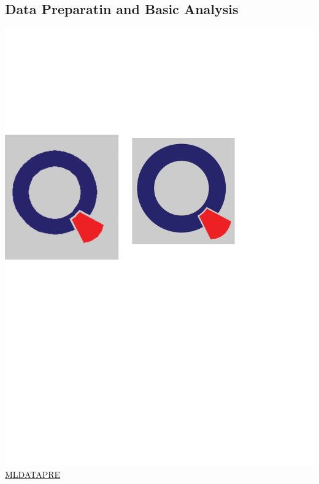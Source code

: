 \documentclass[12pt, a4paper, bibliography=totoc, english]{scrartcl}
\begin{document}
\subsection{Data Preparatin and Basic Analysis}
\includegraphics[scale=0.08]{qletlogo}
\textcolor{blue}{\href{https://github.com/JingyiLiu3136/MLFBM/blob/master/MLDATAPRE/SPL_MLDATAPRE.R}{MLDATAPRE}}
\end{document}
